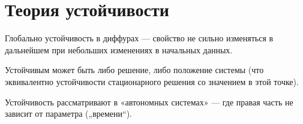 \documentclass[12pt, a4paper]{article}
\begin{document}
\section{Теория устойчивости}

Глобально устойчивость в диффурах — свойство 
не сильно изменяться в дальнейшем 
при небольших изменениях в начальных данных.

Устойчивым может быть либо решение, либо положение системы 
(что эквивалентно устойчивости стационарного решения со значением в этой точке).

Устойчивость рассматривают в «автономных системах» 
— где правая часть не зависит от параметра („времени“).
\end{document}

